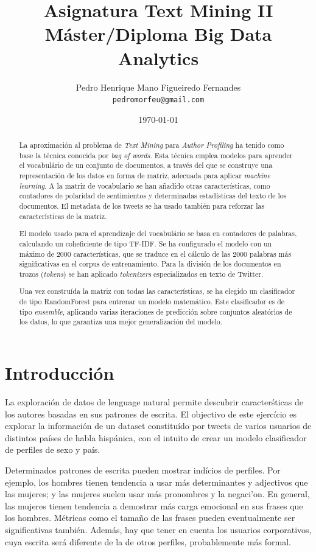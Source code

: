 \documentclass[11pt,a4paper]{article}
\title{Asignatura Text Mining II\\
M\'aster/Diploma Big Data Analytics}
\author{Pedro Henrique Mano Figueiredo Fernandes \\
  {\tt pedromorfeu@gmail.com} \\}
\date{\today}
\begin{document}
\maketitle
\begin{abstract}
  
  La aproximaci\'on al problema de {\em Text Mining} para {\em Author Profiling} ha tenido como base la t\'ecnica conocida por {\em bag of words}. Esta t\'ecnica emplea modelos para aprender el vocabul\'ario de un conjunto de documentos, a trav\'es del que se construye una representaci\'on de los datos en forma de matriz, adecuada para aplicar {\em machine learning}. A la matriz de vocabulario se han a\~nadido otras caracter\'isticas, como contadores de polaridad de sentimientos y determinadas estad\'isticas del texto de los documentos. El metadata de los tweets se ha usado también para reforzar las caracter\'isticas de la matriz.
  
  El modelo usado para el aprendizaje del vocabul\'ario se basa en contadores de palabras, calculando un coheficiente de tipo TF-IDF. Se ha configurado el modelo con un máximo de 2000 caracter\'isticas, que se traduce en el c\'alculo de las 2000 palabras más significativas en el corpus de entrenamiento. Para la divisi\'on de los documentos en trozos ({\em tokens}) se han aplicado {\em tokenizers} especializados en texto de Twitter.
  
  Una vez constru\'ida la matriz con todas las caracter\'isticas, se ha elegido un clasificador de tipo RandomForest para entrenar un modelo matem\'atico. Este clasificador es de tipo {\em ensemble}, aplicando varias iteraciones de predicci\'on sobre conjuntos aleat\'orios de los datos, lo que garantiza una mejor generalizaci\'on del modelo.

\end{abstract}


\section{Introducci\'on}

  La exploraci\'on de datos de lenguage natural permite descubrir caracter\'sticas de los autores basadas en sus patrones de escrita. El objectivo de este ejerc\'icio es explorar la informaci\'on de un dataset constitu\'ido por tweets de varios usuarios de distintos pa\'ises de habla hisp\'anica, con el intuito de crear un modelo clasificador de perfiles de sexo y pa\'is.
  
  Determinados patrones de escrita pueden mostrar ind\'icios de perfiles. Por ejemplo, los hombres tienen tendencia a usar m\'as determinantes y adjectivos que las mujeres; y las mujeres suelen usar m\'as pronombres y la negaci'on. En general, las mujeres tienen tendencia a demostrar m\'as carga emocional en sus frases que los hombres. M\'etricas como el tamaño de las frases pueden eventualmente ser significativas tambi\'en. Adem\'as, hay que tener en cuenta los usuarios corporativos, cuya escrita ser\'a diferente de la de otros perfiles, probablemente m\'as formal.
  
\end{document}

